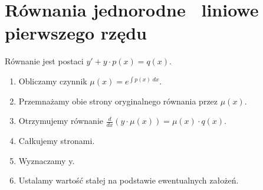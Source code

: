 \section{Równania jednorodne \ liniowe pierwszego rzędu}
Równanie jest postaci \( y' + y \cdot p(x) = q(x) \).
\begin{enumerate}
\onehalfspacing
    \item Obliczamy czynnik \( \mu(x) = e^{\int p(x) \;dx} \).
    \item Przemnażamy obie strony oryginalnego równania przez \( \mu(x) \).
    \item Otrzymujemy równanie \( \frac{d}{dx}\left(y \cdot \mu(x)\right) = \mu(x) \cdot q(x) \).
    \item Całkujemy stronami.
    \item Wyznaczamy y.
    \item Ustalamy wartość stałej na podstawie ewentualnych założeń.
\end{enumerate}